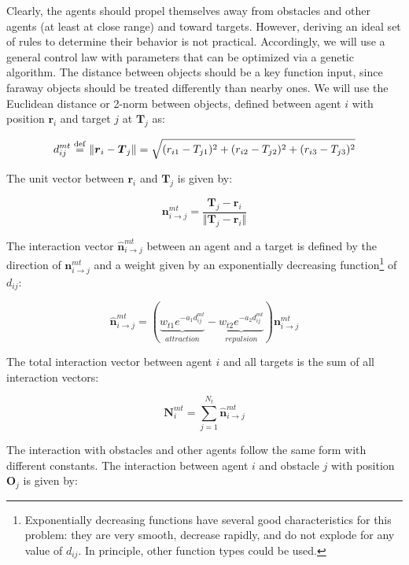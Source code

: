 \documentclass{article}
\begin{document}
Clearly, the agents should propel themselves away from obstacles and other agents (at least at close range) and toward targets. However, deriving an ideal set of rules to determine their behavior is not practical. Accordingly, we will use a general control law with parameters that can be optimized via a genetic algorithm. The distance between objects should be a key function input, since faraway objects should be treated differently than nearby ones. We will use the Euclidean distance or 2-norm between objects, defined between agent $i$ with position $\boldsymbol{r}_i$ and target $j$ at $\boldsymbol{T}_j$ as: 

\begin{equation}
    d^{mt}_{ij} \stackrel{\rm def}{=} \Vert \boldsymbol{r}_i - \boldsymbol{T}_j \Vert = \sqrt{(r_{i1} - T_{j1})^2 + (r_{i2} - T_{j2})^2 + (r_{i3} - T_{j3})^2} 
\end{equation}

The unit vector between $\boldsymbol{r}_i$ and  $\boldsymbol{T}_j$ is given by: 

\begin{equation}
    \boldsymbol{n}_{i\to j}^{mt} = \frac{\boldsymbol{T}_j - \boldsymbol{r}_i}{\Vert \boldsymbol{T}_j - \boldsymbol{r}_i \Vert}
\end{equation}

The interaction vector $\boldsymbol{\hat{n}}_{i\to j}^{mt} $ between an agent and a target is defined by the direction of $\boldsymbol{n}_{i\to j}^{mt}$ and a weight given by an exponentially decreasing function\footnote{Exponentially decreasing functions have several good characteristics for this problem: they are very smooth, decrease rapidly, and do not explode for any value of $d_{ij}$. In principle, other function types could be used.} of $d_{ij}$: 

\begin{equation}\label{nMThat}
    \boldsymbol{\hat{n}}_{i\to j}^{mt}  = (\underbrace{w_{t1}e^{-a_1d^{mt}_{ij}}}_{attraction} - \underbrace{w_{t2}e^{-a_2d^{mt}_{ij}}}_{repulsion})\boldsymbol{n}_{i\to j}^{mt} 
\end{equation}

The total interaction vector between agent $i$ and all targets is the sum of all interaction vectors: 

\begin{equation}
    \boldsymbol{N}_i^{mt} = \sum_{j = 1}^{N_t}\boldsymbol{\hat{n}}_{i\to j}^{mt}
\end{equation}

The interaction with obstacles and other agents follow the same form with different constants. The interaction between agent $i$ and obstacle $j$ with position $\boldsymbol{O}_j$ is given by: 
\end{document}

